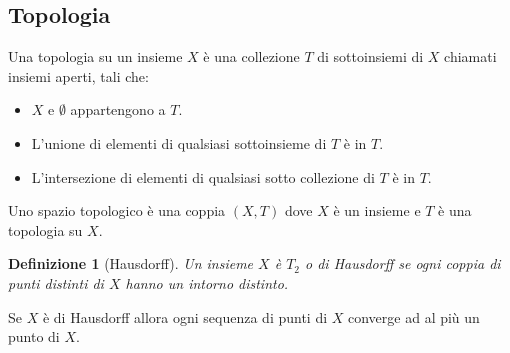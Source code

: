 \documentclass[a4paper, 12pt]{article}
\newtheorem{definition}{Definizione}
\begin{document}
\subsection{Topologia}
Una topologia su un insieme $X$ è una collezione $T$ di sottoinsiemi di $X$ chiamati insiemi aperti, tali che:
\begin{itemize}
    \item $X$ e $\emptyset$ appartengono a $T$.
    \item L'unione di elementi di qualsiasi sottoinsieme di $T$ è in $T$.
    \item L'intersezione di elementi di qualsiasi sotto collezione di $T$ è in $T$.
\end{itemize}
Uno spazio topologico è una coppia $(X,T)$ dove $X$ è un insieme e $T$ è una topologia su $X$.
\begin{definition}[Hausdorff]
Un insieme $X$ è $T_2$ o di Hausdorff se ogni coppia di punti distinti di $X$ hanno un intorno distinto.
\end{definition}
Se $X$ è di Hausdorff allora ogni sequenza di punti di $X$ converge ad al più un punto di $X$.
\end{document}
